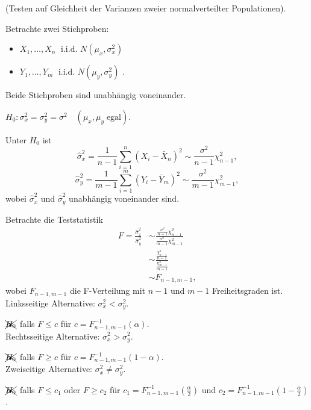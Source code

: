 \documentclass{tstextbook}
\begin{document}
\begin{example}
	(Testen auf Gleichheit der Varianzen zweier normalverteilter Populationen).
	
	Betrachte zwei Stichproben:
		\begin{itemize}
		\item $ X_1,\ldots,X_n \;$ i.i.d. $ N\left(\mu_x, \sigma_x^2\right) $ 
		\item $ Y_1,\ldots,Y_m \;$ i.i.d. $ N\left(\mu_y, \sigma_y^2\right) $ .
	\end{itemize}
	Beide Stichproben sind unabhängig voneinander.
	
	$ H_0 \colon \sigma_x^2 = \sigma_y^2 = \sigma^2 \quad (\mu_x,\mu_y \; \text{egal}) $.
	
	Unter $ H_0 $ ist 
	\[ 
	\hat{\sigma}_x^2 = \frac{1}{n-1}\sum_{i=1}^{n}(X_i-\bar{X}_n)^2 \sim \frac{\sigma^2}{n-1}\chi^2_{n-1} ,
	\]
		\[ 
	\hat{\sigma}_y^2 = \frac{1}{m-1}\sum_{i=1}^{m}(Y_i-\bar{Y}_m)^2 \sim \frac{\sigma^2}{m-1}\chi^2_{m-1} ,
	\] wobei $ \hat{\sigma}_x^2 $ und $ \hat{\sigma}_y^2 $ unabhängig voneinander sind.
	
	Betrachte die Teststatistik 
	\[
	\begin{aligned}
		F = \frac{\hat{\sigma}_x^2}{\hat{\sigma}_y^2} & \sim \frac{\frac{\sigma^2}{n-1}\chi^2_{n-1}}{\frac{\sigma^2}{m-1}\chi^2_{m-1}} \\
		& \sim \frac{\frac{\chi^2_{n-1}}{n-1}}{\frac{\chi^2_{m-1}}{m-1}} \\
		& \sim F_{n-1,m-1}, 
	\end{aligned}
	\] wobei $ F_{n-1,m-1} $ die F-Verteilung mit $ n-1 $ und $ m-1 $ Freiheitsgraden ist. \\
	
	Linksseitige Alternative: $ \sigma_x^2 < \sigma_y^2 $. 
	
	$ \xcancel{H_0} $ falls $ F \le c $ für $ c = F_{n-1,m-1}^{-1} \left(\alpha\right) $. \\
	
	Rechtsseitige Alternative: $ \sigma_x^2 > \sigma_y^2 $. 
	
	$ \xcancel{H_0} $ falls $ F \ge c $ für $ c = F_{n-1,m-1}^{-1} \left(1-\alpha\right) $. \\
	
	Zweiseitige Alternative: $ \sigma_x^2 \ne \sigma_y^2 $. 
	
	$ \xcancel{H_0} $ falls $ F \le c_1 $ oder $ F \ge c_2 $ für $ c_1 = F_{n-1,m-1}^{-1} \left(\frac{\alpha}{2}\right) $ und $ c_2 = F_{n-1,m-1}^{-1} \left(1-\frac{\alpha}{2}\right) $. \\
	

\end{example}
\end{document}
